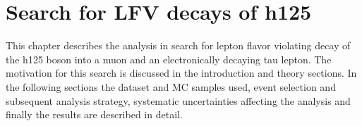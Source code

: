 
%
%

\chapter{Search for LFV decays of h125}

This chapter describes the analysis in search for lepton flavor violating decay of the h125 boson into a muon and an electronically decaying tau lepton. The motivation for this search is discussed in the introduction and theory sections. In the following sections the dataset and MC samples used, event selection and subsequent analysis strategy, systematic uncertainties affecting the analysis and finally the results are described in detail.




%
% 
% 
